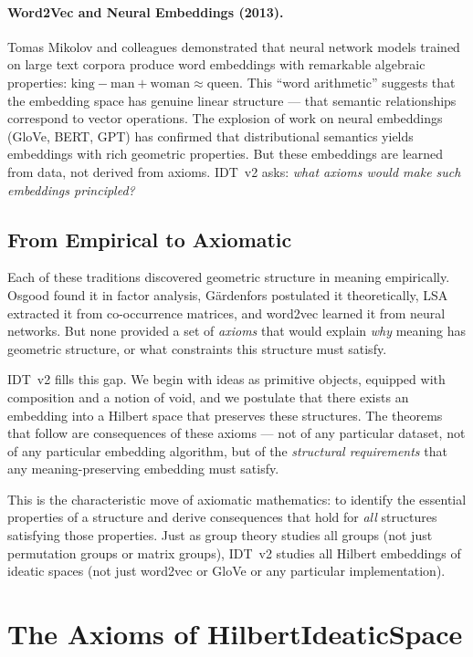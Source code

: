 \paragraph{Word2Vec and Neural Embeddings (2013).}
Tomas Mikolov and colleagues demonstrated that neural network models trained on
large text corpora produce word embeddings with remarkable algebraic properties:
$\text{king} - \text{man} + \text{woman} \approx \text{queen}$. This ``word
arithmetic'' suggests that the embedding space has genuine linear structure ---
that semantic relationships correspond to vector operations. The explosion of
work on neural embeddings (GloVe, BERT, GPT) has confirmed that distributional
semantics yields embeddings with rich geometric properties. But these embeddings
are learned from data, not derived from axioms. IDT~v2 asks: \emph{what axioms
would make such embeddings principled?}

\subsection{From Empirical to Axiomatic}

Each of these traditions discovered geometric structure in meaning empirically.
Osgood found it in factor analysis, G\"ardenfors postulated it theoretically,
LSA extracted it from co-occurrence matrices, and word2vec learned it from
neural networks. But none provided a set of \emph{axioms} that would explain
\emph{why} meaning has geometric structure, or what constraints this structure
must satisfy.

IDT~v2 fills this gap. We begin with ideas as primitive objects, equipped with
composition and a notion of void, and we postulate that there exists an embedding
into a Hilbert space that preserves these structures. The theorems that follow
are consequences of these axioms --- not of any particular dataset, not of any
particular embedding algorithm, but of the \emph{structural requirements} that
any meaning-preserving embedding must satisfy.

This is the characteristic move of axiomatic mathematics: to identify the
essential properties of a structure and derive consequences that hold for
\emph{all} structures satisfying those properties. Just as group theory studies
all groups (not just permutation groups or matrix groups), IDT~v2 studies all
Hilbert embeddings of ideatic spaces (not just word2vec or GloVe or any
particular implementation).


\section{The Axioms of HilbertIdeaticSpace}

